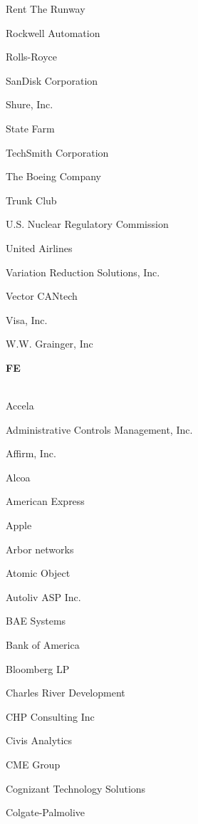 \documentclass[twoside]{article}
\begin{document}
\begin{center}
\begin{multicols}{5}
\begin{FlushLeft}
\begin{compactitem}
\item Rent The Runway
\item Rockwell Automation
\item Rolls-Royce
\item SanDisk Corporation
\item Shure, Inc.
\item State Farm
\item TechSmith Corporation
\item The Boeing Company
\item Trunk Club
\item U.S. Nuclear Regulatory Commission
\item United Airlines
\item Variation Reduction Solutions, Inc.
\item Vector CANtech
\item Visa, Inc.
\item W.W. Grainger, Inc
\end{compactitem}
        \end{FlushLeft}
        \vspace{1em}
        {\fontsize{14}{16}\selectfont \bf FE}\\
        \vspace{-1em}
        ~\hrulefill~
        \vspace{-.9em}
        \begin{FlushLeft}
        \begin{compactitem}
        \item Accela
\item Administrative Controls Management, Inc.
\item Affirm, Inc.
\item Alcoa
\item American Express
\item Apple
\item Arbor networks
\item Atomic Object
\item Autoliv ASP Inc.
\item BAE Systems
\item Bank of America
\item Bloomberg LP
\item Charles River Development
\item CHP Consulting Inc
\item Civis Analytics
\item CME Group
\item Cognizant Technology Solutions
\item Colgate-Palmolive

\end{compactitem}
\end{FlushLeft}
\end{multicols}
\end{center}
\end{document}
